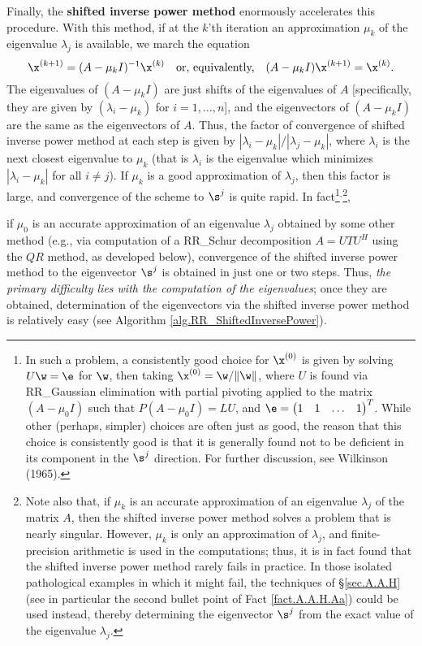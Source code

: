 Finally, the {\bf shifted inverse power method} enormously accelerates this procedure.
With this method, if at the $k$'th iteration an approximation $\mu_k$ of the eigenvalue $\lambda_{j}$ is available, we march the equation
\begin{equation}
\x^{(k+1)}=(A-\mu_k I)^{-1}\x^{(k)} \quad \textrm{or, equivalently,} \quad (A-\mu_k I)\x^{(k+1)}=\x^{(k)}.\label{eq.shiftedinversepowermethod}
\end{equation}
The eigenvalues of $(A-\mu_k I)$ are just shifts of the eigenvalues of $A$ [specifically, they are given by
$(\lambda_i-\mu_k)$ for $i=1,\ldots,n$], and the eigenvectors of $(A-\mu_k I)$ are the same as the eigenvectors of $A$.
Thus, the factor of convergence of shifted inverse power method at each step is given by $|\lambda_{i}-\mu_k|/|\lambda_{j}-\mu_k|$, where $\lambda_{i}$
is the next closest eigenvalue to $\mu_k$ (that is $\lambda_i$ is the eigenvalue which minimizes $|\lambda_{i}-\mu_k|$ for all $i\ne j$).
If $\mu_k$ is a good approximation of $\lambda_{j}$, then this factor is large, and convergence of the scheme to $\s^j$ is quite rapid.
In fact\footnote{In such a problem, a consistently good choice for $\x^{(0)}$ is given by solving $U\w=\e$ for $\w$, then taking $\x^{(0)}=\w/\Vert \w \Vert$, where
$U$ is found via RR_Gaussian elimination with partial pivoting applied to the matrix $(A-\mu_0 I)$
such that $P(A-\mu_0 I)=LU$, and
$\e=\begin{pmatrix} 1 & 1 & \ldots & 1\end{pmatrix}^T$. While other (perhaps, simpler) choices are often just as good,
the reason that this choice is consistently good is that
it is generally found not to be deficient in its component in the $\s^j$ direction.
For further discussion, see Wilkinson (1965).}${}^{,}$\footnote{Note also that, if $\mu_k$ is an accurate approximation of an eigenvalue $\lambda_j$
of the matrix $A$, then the shifted inverse power method solves a problem that is nearly singular.  However,
$\mu_k$ is only an approximation of $\lambda_j$, and finite-precision arithmetic is used in the computations;
thus, it is in fact found that the shifted inverse power method rarely fails in practice.
In those isolated pathological examples in which it might fail, the techniques of \S \ref{sec.A.A.H} (see in particular the second
bullet point of Fact \ref{fact.A.A.H.Aa}) could be used instead, thereby determining the eigenvector $\s^j$ from the exact value of the eigenvalue
$\lambda_j$.},
\beginmylistb
\item if $\mu_0$ is an accurate approximation of an eigenvalue $\lambda_{j}$ obtained by some other method (e.g., via computation of a RR_Schur
decomposition $A=UTU^H$ using the $QR$ method, as developed below), convergence of the shifted inverse power method
to the eigenvector $\s^j$ is obtained in just one or two steps.
\endmylist
Thus, {\it the primary difficulty lies with the computation of the eigenvalues}; once they are obtained, determination of the eigenvectors
via the shifted inverse power method is relatively easy (see Algorithm \ref{alg.RR_ShiftedInversePower}).

